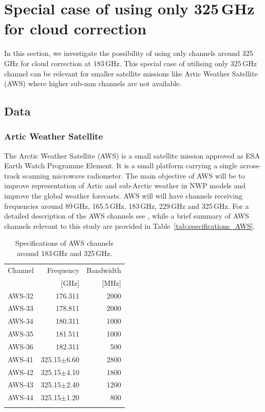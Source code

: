 \documentclass[amt, manuscript]{copernicus}
\begin{document}
\section{Special case of using only 325\,GHz for cloud correction}
In this section, we investigate the possibility of using only channels around
325\,GHz for cloud correction at 183\,GHz. This special case of utilising only
325\,GHz channel can be relevant for smaller satellite missions like Artic
Weather Satellite (AWS) where higher sub-mm channels are not available.

\subsection{Data}
\subsubsection{Artic Weather Satellite}
The Arctic Weather Satellite (AWS) is a small satellite mission approved as ESA
Earth Watch Programme Element. It is a small platform carrying a single
across-track scanning microwave radiometer. The main objective of AWS will be
to improve representation of Artic and sub-Arctic weather in NWP models and
improve the global weather forecasts. AWS will will have channels receiving
frequencies around 89\,GHz, 165.5\,GHz, 183\,GHz, 229\,GHz and 325\,GHz. For a
detailed description of the AWS channels see \citep{eriksson2020study}, while a
brief summary of AWS channels relevant to this study are provided in
Table~\ref{tab:specifications_AWS}.


\begin{table}[t]
	\label{tab:ICI_MWI_channels}	
	\caption{Specifications of AWS channels around 183\,GHz and 325\,GHz.}
	\begin{tabular}{lrr}
		\tophline
		Channel & Frequency 	& Bandwidth  \\
				& [GHz]			& [MHz]		\\
		\middlehline
		AWS-32	&	176.311    & 2000 		\\
		AWS-33	&	178.811    & 2000 		\\
		AWS-34	&	180.311    & 1000 		\\
		AWS-35	&	181.511    & 1000 		 \\
		AWS-36	&	182.311    & \phantom{0}500 	 \\
	    AWS-41    & 325.15$\pm$6.60    & 2800 \\
		AWS-42    & 325.15$\pm$4.10    & 1800  \\
		AWS-43    & 325.15$\pm$2.40    & 1200 \\
		AWS-44    & 325.15$\pm$1.20    & \phantom{0}800  \\
			\bottomhline
	\end{tabular}
	\belowtable{} %
\end{table}
\end{document}
